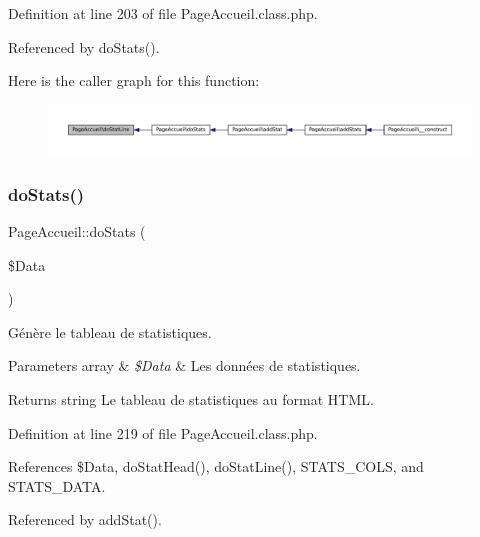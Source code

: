 Definition at line 203 of file Page\+Accueil.\+class.\+php.



Referenced by do\+Stats().

Here is the caller graph for this function\+:\nopagebreak
\begin{figure}[H]
\begin{center}
\leavevmode
\includegraphics[width=350pt]{class_page_accueil_a4350b2f1c419b669294b5dc89c6e3568_icgraph}
\end{center}
\end{figure}
\mbox{\label{class_page_accueil_ac3d7722a9e10fe717e07f5e30550f3a3}} 
\subsubsection{\texorpdfstring{do\+Stats()}{doStats()}}
{\footnotesize\ttfamily Page\+Accueil\+::do\+Stats (\begin{DoxyParamCaption}\item[{}]{\$\+Data }\end{DoxyParamCaption})\hspace{0.3cm}{\ttfamily [protected]}}

Génère le tableau de statistiques.


\begin{DoxyParams}[1]{Parameters}
array & {\em \$\+Data} & Les données de statistiques. \\
\hline
\end{DoxyParams}
\begin{DoxyReturn}{Returns}
string Le tableau de statistiques au format H\+T\+ML. 
\end{DoxyReturn}


Definition at line 219 of file Page\+Accueil.\+class.\+php.



References \$\+Data, do\+Stat\+Head(), do\+Stat\+Line(), S\+T\+A\+T\+S\+\_\+\+C\+O\+LS, and S\+T\+A\+T\+S\+\_\+\+D\+A\+TA.



Referenced by add\+Stat().

